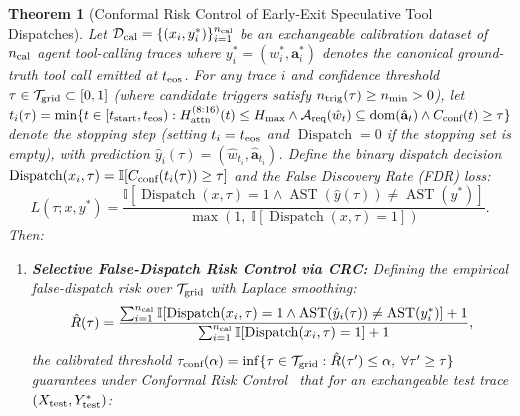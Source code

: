 \documentclass[10pt,conference]{IEEEtran}
\newtheorem{theorem}{Theorem}
\begin{document}
\begin{theorem}[Conformal Risk Control of Early-Exit Speculative Tool Dispatches]
\label{thm:conformal}
Let $\mathcal{D}_{\textnormal{cal}} = \{(x_i, y_i^*)\}_{i=1}^{n_{\textnormal{cal}}}$ be an exchangeable calibration dataset of $n_{\textnormal{cal}}$ agent tool-calling traces where $y_i^* = (w_i^*, \mathbf{a}_i^*)$ denotes the canonical ground-truth tool call emitted at $t_{\textnormal{eos}}$. For any trace $i$ and confidence threshold $\tau \in \mathcal{T}_{\textnormal{grid}} \subset [0, 1]$ (where candidate triggers satisfy $n_{\textnormal{trig}}(\tau) \ge n_{\min} > 0$), let $t_i(\tau) = \min\{t \in [t_{\textnormal{start}}, t_{\textnormal{eos}}) : H_{\textnormal{attn}}^{(8:16)}(t) \le H_{\max} \wedge \mathcal{A}_{\textnormal{req}}(\hat{w}_t) \subseteq \operatorname{dom}(\hat{\mathbf{a}}_t) \wedge C_{\textnormal{conf}}(t) \ge \tau\}$ denote the stopping step (setting $t_i = t_{\textnormal{eos}}$ and $\operatorname{Dispatch}=0$ if the stopping set is empty), with prediction $\hat{y}_i(\tau) = (\hat{w}_{t_i}, \hat{\mathbf{a}}_{t_i})$. Define the binary dispatch decision $\operatorname{Dispatch}(x_i, \tau) = \mathbb{I}[C_{\textnormal{conf}}(t_i(\tau)) \ge \tau]$ and the False Discovery Rate (FDR) loss:
\begin{equation}
L(\tau; x, y^*) = \frac{\mathbb{I}\!\left[\operatorname{Dispatch}(x, \tau) = 1 \wedge \operatorname{AST}(\hat{y}(\tau)) \ne \operatorname{AST}(y^*)\right]}{\max\left(1, \; \mathbb{I}\!\left[\operatorname{Dispatch}(x, \tau) = 1\right]\right)}.
\end{equation}
Then:
\begin{enumerate}
    \item \textbf{Selective False-Dispatch Risk Control via CRC:} Defining the empirical false-dispatch risk over $\mathcal{T}_{\textnormal{grid}}$ with Laplace smoothing:
    \begin{equation}
    \hat{R}(\tau) = \frac{\sum_{i=1}^{n_{\textnormal{cal}}} \mathbb{I}\!\left[\operatorname{Dispatch}(x_i, \tau) = 1 \wedge \operatorname{AST}(\hat{y}_i(\tau)) \ne \operatorname{AST}(y_i^*)\right] + 1}{\sum_{i=1}^{n_{\textnormal{cal}}} \mathbb{I}\!\left[\operatorname{Dispatch}(x_i, \tau) = 1\right] + 1},
    \end{equation}
    the calibrated threshold $\tau_{\textnormal{conf}}(\alpha) = \inf\{\tau \in \mathcal{T}_{\textnormal{grid}} : \hat{R}(\tau') \le \alpha,\; \forall \tau' \ge \tau\}$ guarantees under Conformal Risk Control~\cite{angelopoulos2023conformal} that for an exchangeable test trace $(X_{\textnormal{test}}, Y_{\textnormal{test}}^*)$:

\end{enumerate}
\end{theorem}
\end{document}
